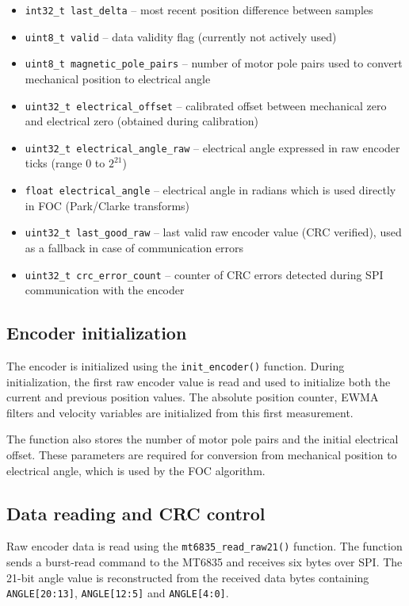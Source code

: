 \begin{itemize}
\item \verb|int32_t last_delta| -- most recent position difference between samples

\item \verb|uint8_t valid| -- data validity flag (currently not actively used)

\item \verb|uint8_t magnetic_pole_pairs| -- number of motor pole pairs used to convert mechanical position to electrical angle

\item \verb|uint32_t electrical_offset| -- calibrated offset between mechanical zero and electrical zero (obtained during calibration)

\item \verb|uint32_t electrical_angle_raw| -- electrical angle expressed in raw encoder ticks (range $0$ to $2^{21}$)

\item \verb|float electrical_angle| -- electrical angle in radians which is used directly in FOC (Park/Clarke transforms)

\item \verb|uint32_t last_good_raw| -- last valid raw encoder value (CRC verified), used as a fallback in case of communication errors

\item \verb|uint32_t crc_error_count| -- counter of CRC errors detected during SPI communication with the encoder

\end{itemize}

\subsection{Encoder initialization}
The encoder is initialized using the \texttt{init\_encoder()} function. During initialization, the first raw encoder value is read and used to initialize both the current and previous position values. The absolute position counter, EWMA filters and velocity variables are initialized from this first measurement.

The function also stores the number of motor pole pairs and the initial electrical offset. These parameters are required for conversion from mechanical position to electrical angle, which is used by the FOC algorithm.

\subsection{Data reading and CRC control}
Raw encoder data is read using the \texttt{mt6835\_read\_raw21()} function. The function sends a burst-read command to the MT6835 and 
receives six bytes over SPI. The 21-bit angle value is reconstructed from the received data bytes
containing \texttt{ANGLE[20:13]}, \texttt{ANGLE[12:5]} and \texttt{ANGLE[4:0]}.

